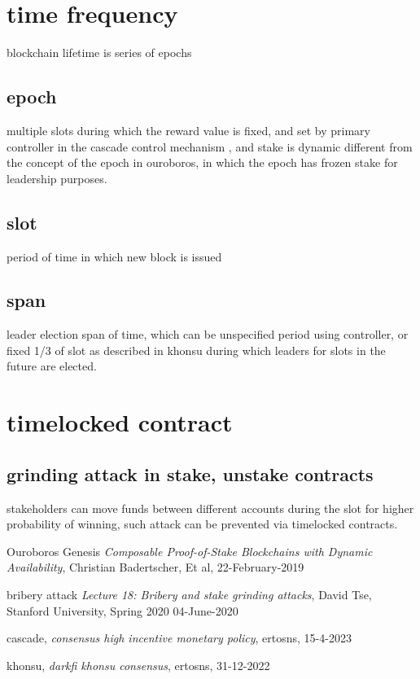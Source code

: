 \documentclass{article}
\begin{document}
\section {time frequency}
blockchain lifetime is series of epochs

\subsection {epoch}
multiple slots during which the reward value is fixed, and set by primary controller in the cascade control mechanism \cite{cascade}, and stake is dynamic different from the concept of the epoch in ouroboros, in which the epoch has frozen stake for leadership purposes.

\subsection {slot}
period of time in which new block is issued

\subsection {span}
leader election span of time, which can be unspecified period using controller, or fixed 1/3 of slot as described in khonsu \cite{khonsu} during which leaders for slots in the future are elected.

\section {timelocked contract}
\label{timelocked}
\subsection {grinding attack in stake, unstake contracts}
stakeholders can move funds between different accounts during the slot for higher probability of winning, such attack can be prevented via timelocked contracts.



\begin{thebibliography}{999}

  Ouroboros Genesis
  \emph{Composable Proof-of-Stake Blockchains with Dynamic Availability},
  Christian Badertscher, Et al,
  22-February-2019

  bribery attack
  \emph{Lecture 18: Bribery and stake grinding attacks},
  David Tse,
  Stanford University, Spring 2020
  04-June-2020

  cascade,
  \emph{consensus high incentive monetary policy},
  ertosns,
  15-4-2023

  khonsu,
  \emph{darkfi khonsu consensus},
  ertosns,
  31-12-2022


\end{thebibliography}
\end{document}
